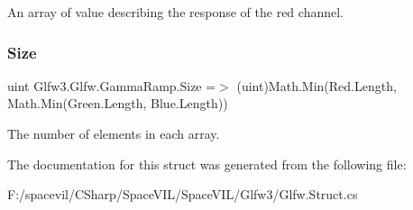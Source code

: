 An array of value describing the response of the red channel. 

\mbox{\label{struct_glfw3_1_1_glfw_1_1_gamma_ramp_a38e746b1d258843a530476a32dc485d8}} 
\subsubsection{\texorpdfstring{Size}{Size}}
{\footnotesize\ttfamily uint Glfw3.\+Glfw.\+Gamma\+Ramp.\+Size =$>$ (uint)Math.\+Min(Red.\+Length, Math.\+Min(Green.\+Length, Blue.\+Length))}



The number of elements in each array. 



The documentation for this struct was generated from the following file\+:\begin{DoxyCompactItemize}
\item 
F\+:/spacevil/\+C\+Sharp/\+Space\+V\+I\+L/\+Space\+V\+I\+L/\+Glfw3/Glfw.\+Struct.\+cs\end{DoxyCompactItemize}
